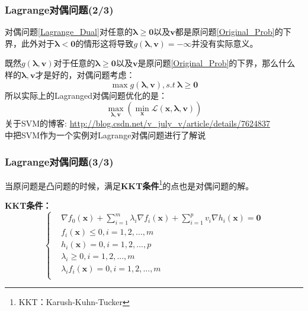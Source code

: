 \documentclass{beamer}
\begin{document}
\begin{frame}\frametitle{Lagrange对偶问题(2/3)}
对偶问题\ref{Lagrange_Dual}对任意的$\bm{\lambda} \geq \bm{0}$以及$\bm{v}$都是原问题\ref{Original_Prob}的下界，此外对于$\bm{\lambda} < \bm{0}$的情形这将导致$g(\bm{\lambda},\bm{v})=-\infty$并没有实际意义。

既然$g(\bm{\lambda},\bm{v})$对于任意的$\bm{\lambda} \geq \bm{0}$以及$\bm{v}$是原问题\ref{Original_Prob}的下界，那么什么样的$\bm{\lambda},\bm{v}$才是好的，对偶问题考虑：
\begin{equation}
\label{Dual_Prob}
\max g(\bm{\lambda},\bm{v}),s.t~\bm{\lambda} \geq \bm{0}
\end{equation}
所以实际上的Lagranged对偶问题优化的是：
\begin{displaymath}
\max_{\bm{\lambda},\bm{v}}\left(\min_{\bm{x}}\mathcal{L}(\bm{x},\bm{\lambda},\bm{v})\right)
\end{displaymath}
关于SVM的博客: \url{http://blog.csdn.net/v_july_v/article/details/7624837}\\中把SVM作为一个实例对Lagrange对偶问题进行了解说
\end{frame}
\begin{frame}\frametitle{Lagrange对偶问题(3/3)}
当原问题是凸问题的时候，满足\textbf{KKT条件}\footnote{KKT：Karush-Kuhn-Tucker}的点也是对偶问题的解。

\textbf{KKT条件：}
\begin{displaymath}
\left\{
\begin{aligned}
&\nabla f_0(\bm{x})+\sum_{i=1}^{m}\lambda_i \nabla f_i(\bm{x})+\sum_{i=1}^{p}v_i \nabla h_i(\bm{x})=\bm{0}\\
&f_i(\bm{x}) \leq 0,i=1,2,...,m\\
&h_i(\bm{x}) =0,i=1,2,...,p\\
&\lambda_i \geq 0,i=1,2,...,m\\
&\lambda_i f_i(\bm{x})=0, i=1,2,...,m\\
\end{aligned}
\right.
\end{displaymath}
\end{frame}
\end{document}
